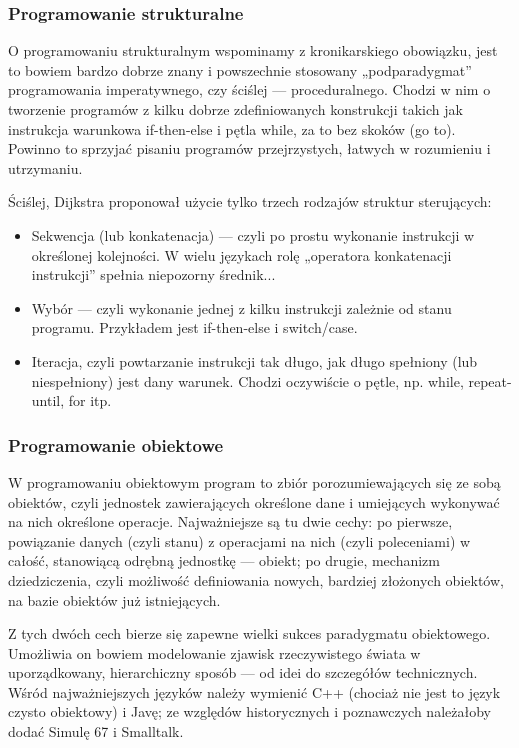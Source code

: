\documentclass[a4paper,12pt,oneside]{book}
\begin{document}
				\subsubsection{Programowanie strukturalne}
				O programowaniu strukturalnym wspominamy z kronikarskiego obowiązku, jest to bowiem bardzo dobrze znany i powszechnie stosowany „podparadygmat” programowania imperatywnego, czy ściślej — proceduralnego. Chodzi w nim o tworzenie programów z kilku dobrze zdefiniowanych konstrukcji takich jak instrukcja warunkowa if-then-else i pętla while, za to bez skoków (go to). Powinno to sprzyjać pisaniu programów przejrzystych, łatwych w rozumieniu i utrzymaniu.
				
				Ściślej, Dijkstra proponował użycie tylko trzech rodzajów struktur sterujących:
				\begin{itemize}
					\item Sekwencja (lub konkatenacja) — czyli po prostu wykonanie instrukcji w określonej kolejności. W wielu językach rolę „operatora konkatenacji instrukcji” spełnia niepozorny średnik...
					\item Wybór — czyli wykonanie jednej z kilku instrukcji zależnie od stanu programu. Przykładem jest if-then-else i switch/case.
					\item Iteracja, czyli powtarzanie instrukcji tak długo, jak długo spełniony (lub niespełniony) jest dany warunek. Chodzi oczywiście o pętle, np. while, repeat-until, for itp.
				\end{itemize}
			
			
				\subsubsection{Programowanie obiektowe}
				W programowaniu obiektowym program to zbiór porozumiewających się ze sobą obiektów, czyli jednostek zawierających określone dane i umiejących wykonywać na nich określone operacje. Najważniejsze są tu dwie cechy: po pierwsze, powiązanie danych (czyli stanu) z operacjami na nich (czyli poleceniami) w całość, stanowiącą odrębną jednostkę — obiekt; po drugie, mechanizm dziedziczenia, czyli możliwość definiowania nowych, bardziej złożonych obiektów, na bazie obiektów już istniejących.
				
				Z tych dwóch cech bierze się zapewne wielki sukces paradygmatu obiektowego. Umożliwia on bowiem modelowanie zjawisk rzeczywistego świata w uporządkowany, hierarchiczny sposób — od idei do szczegółów technicznych. Wśród najważniejszych języków należy wymienić C++ (chociaż nie jest to język czysto obiektowy) i Javę; ze względów historycznych i poznawczych należałoby dodać Simulę 67 i Smalltalk.
\end{document}
